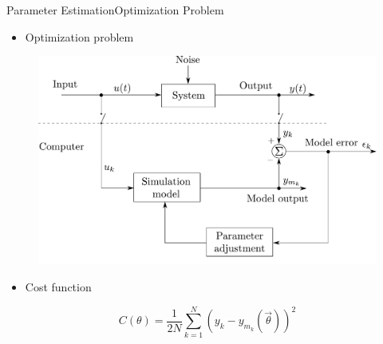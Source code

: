 \begin{frame}{Parameter Estimation}{Optimization Problem}
  \begin{itemize}
    \item Optimization problem
  \end{itemize}  
  \begin{figure}[H]
      \centering
      \includegraphics[scale=0.25]{Pictures/senstoolsModelOptimizationHM}
  \end{figure}\vspace{-12pt}
  \pause
  \begin{itemize}
    \item Cost function
  \end{itemize}
  \begin{displaymath}
    \si{C(\theta) = \frac{1}{2N}\sum_{k = 1}^{N} \left(y_{k} - y_{m_k}(\vec{\theta})\right)^2 }
  \end{displaymath}
\end{frame}


